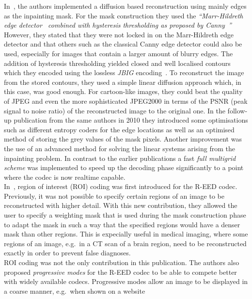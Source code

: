 \noindent In~\cite{mainberger09, mainberger10}, the authors implemented a diffusion based reconstruction
using mainly edges as the inpainting mask. For the mask construction they used the \textit{\enquote{Marr-Hildreth
edge detector~\cite{marr80} combined with hysteresis thresholding as proposed by
Canny~\cite{canny86}}}~\cite{mainberger09}
However, they stated that they were not locked in on the Marr-Hildreth edge detector and that
others such as the classical Canny edge detector could also be used, especially for images that
contain a larger amount of blurry edges. The addition of hysteresis thresholding yielded closed and
well localised contours which they encoded using the lossless \textit{JBIG} encoding~\cite{jbig}.
To reconstruct the image from the stored contours, they used a simple linear diffusion approach
which, in this case, was good enough. For cartoon-like images, they could beat the quality of
JPEG and even the more sophisticated JPEG2000 in terms of the PSNR (peak signal to noise ratio) of the reconstructed image to the
original one. In the follow-up publication from the same authors in 2010 they introduced some 
optimisations such as different
entropy coders for the edge locations as well as an optimised method of storing the grey
values of the mask pixels. Another improvement was the use of an advanced method for solving the
linear systems arising from the inpainting problem. In contrast to the earlier publications a fast
\textit{full multigrid scheme} was implemented to speed up the decoding phase significantly to 
a point where the codec is now realtime capable.\\
\newpage\noindent
In~\cite{peter15}, region of interest (ROI) coding was first introduced for the R-EED codec. Previously,
it was not possible to specify certain regions of an image to be reconstructed with higher detail.
With this new contribution, they allowed the user to specify a weighting mask that is used during
the mask construction phase to adapt the mask in such a way that the specified regions would have a
denser mask than other regions. This is expecially useful in medical imaging, where some regions of
an image, e.g.\ in a CT scan of a brain region, need to be reconstructed exactly in order to prevent
false diagnoses. \\
ROI coding was not the only contribution in this publication. The authors also proposed
\textit{progressive modes} for the R-EED codec to be able to compete better with widely available codecs.
Progressive modes allow an image to be displayed in a coarse manner, e.g.\ when shown on a website
